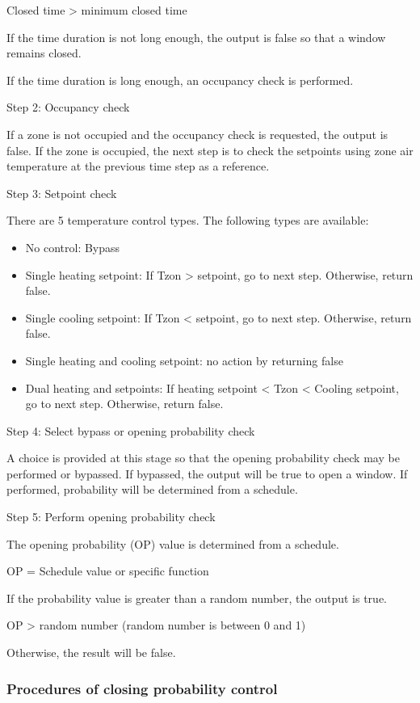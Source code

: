 Closed time \textgreater{} minimum closed time

If the time duration is not long enough, the output is false so that a window remains closed.

If the time duration is long enough, an occupancy check is performed.

Step 2: Occupancy check

If a zone is not occupied and the occupancy check is requested, the output is false. If the zone is occupied, the next step is to check the setpoints using zone air temperature at the previous time step as a reference.

Step 3: Setpoint check

There are 5 temperature control types. The following types are available:

\begin{itemize}
\item No control: Bypass
\item Single heating setpoint: If Tzon \textgreater{} setpoint, go to next step. Otherwise, return false.
\item Single cooling setpoint: If Tzon \textless{} setpoint, go to next step. Otherwise, return false.
\item Single heating and cooling setpoint: no action by returning false
\item Dual heating and setpoints: If heating setpoint \textless{} Tzon \textless{} Cooling setpoint, go to next step. Otherwise, return false.
\end{itemize}

Step 4: Select bypass or opening probability check

A choice is provided at this stage so that the opening probability check may be performed or bypassed. If bypassed, the output will be true to open a window. If performed, probability will be determined from a schedule.

Step 5: Perform opening probability check

The opening probability (OP) value is determined from a schedule.

OP = Schedule value or specific function

If the probability value is greater than a random number, the output is true.

OP \textgreater{} random number (random number is between 0 and 1)

Otherwise, the result will be false.

\subsubsection{Procedures of closing probability control}\label{procedures-of-closing-probability-control}

